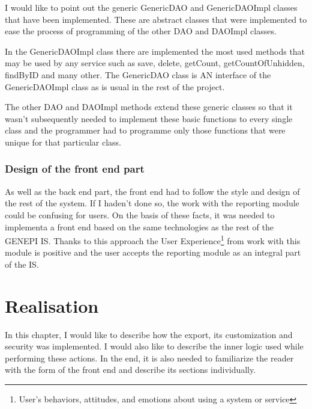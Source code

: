\documentclass[thesis=B,english]{FITthesis}[2012/10/20]
\begin{document}
I would like to point out the generic GenericDAO and GenericDAOImpl classes that have been implemented.
These are abstract classes that were implemented to ease the process of programming of the other DAO and DAOImpl classes.

In the GenericDAOImpl class there are implemented the most used methods that may be used by any service such as save, delete, getCount, getCountOfUnhidden, findByID and many other. The GenericDAO class is AN interface of the GenericDAOImpl class as is usual in the rest of the project. 

The other DAO and DAOImpl methods extend these generic classes so that it wasn't subsequently needed to implement these basic functions to every single class and the programmer had to programme only those functions that were unique for that particular class.

\subsection{Design of the front end part}
As well as the back end part, the front end had to follow the style and design of the rest of the system. If I haden't done so, the work with the reporting module could be confusing for users. On the basis of these facts, it was needed to implementa a front end based on the same technologies as the rest of the GENEPI IS. Thanks to this approach the User Experience\footnote{User's behaviors, attitudes, and emotions about using a system or service} from work with this module is positive and the user accepts the reporting module as an integral part of the IS.

\chapter{Realisation}
In this chapter, I would like to describe how the export, its customization and security was implemented. I would also like to describe the inner logic used while performing these actions. In the end, it is also needed to familiarize the reader with the form of the front end and describe its sections individually.
\end{document}
